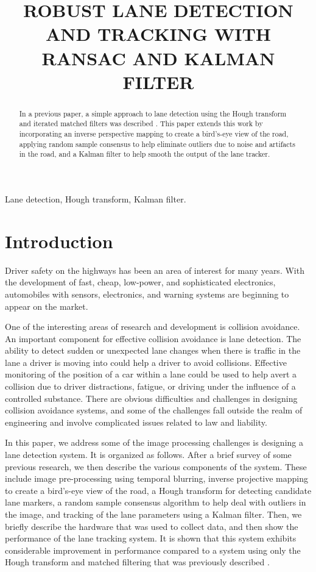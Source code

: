 \documentclass{article}
\title{ROBUST LANE DETECTION AND TRACKING WITH RANSAC AND KALMAN FILTER}
\begin{document}
%
\maketitle
%
\begin{abstract}
In a previous paper, a simple approach to lane detection using the Hough
transform and iterated matched filters was described \cite{borkar_layered_2009}.
This paper extends this work by incorporating an inverse perspective mapping
to create a bird's-eye view of the road, applying random sample consensus to help
eliminate outliers due to noise and artifacts in the road, and a Kalman filter
to help smooth the output of the lane tracker.
\end{abstract}
%
\begin{keywords}
Lane detection, Hough transform, Kalman filter.
\end{keywords}
%
\section{Introduction}
\label{sec:intro}
Driver safety on the highways has been an area of interest for many years.
With the development of fast, cheap, low-power, and sophisticated electronics,
automobiles with sensors, electronics, and warning systems are beginning to appear on the market.

One of the interesting areas of research and development is collision avoidance.
An important component for effective collision avoidance is lane detection.
The ability to detect sudden or unexpected lane changes when there
is traffic in the lane a driver is moving into could help a driver to avoid
collisions.
Effective monitoring of the position of a car within a lane could be used to
help avert a collision due to driver distractions, fatigue, or driving under the influence of a controlled substance.
There are obvious difficulties and challenges in designing collision avoidance
systems, and some of the challenges fall outside the realm of engineering and
involve complicated issues related to law and liability.

In this paper, we address some of the image processing challenges is designing a
lane detection system.  It is organized as follows.
After a brief survey of some previous research, we then describe the various
components of the system.  These include image pre-processing using temporal blurring,
inverse projective mapping to create a bird's-eye view of the road, a Hough transform
for detecting candidate lane markers, a random sample consensus algorithm to
help deal with outliers in the image, and tracking of the lane parameters using a Kalman filter.
Then, we briefly describe the hardware that was used to collect data, and
then show the performance of the lane tracking system.
It is shown that this system exhibits considerable improvement in
performance compared to a system using only the Hough transform and matched filtering that was previously described \cite{borkar_layered_2009}.
\end{document}
